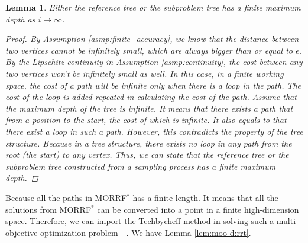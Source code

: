 \documentclass[conference]{IEEEtran}
\newtheorem{lem}{Lemma}
\begin{document}
\begin{lem}
\label{lem:tree:finite_depth}
Either the reference tree or the subproblem tree has a finite maximum depth as $ i \rightarrow \infty $.
\begin{proof}
By Assumption \ref{asmp:finite_accuracy}, we know that the distance between two vertices cannot be infinitely small, which are always bigger than or equal to $ \epsilon $.
By the Lipschitz continuity in Assumption \ref{asmp:continuity}, the cost between any two vertices won't be infinitely small as well.
In this case, in a finite working space, the cost of a path will be infinite only when there is a loop in the path.
The cost of the loop is added repeated in calculating the cost of the path.
Assume that the maximum depth of the tree is infinite.
It means that there exists a path that from a position to the start, the cost of which is infinite.
It also equals to that there exist a loop in such a path.
However, this contradicts the property of the tree structure. 
Because in a tree structure, there exists no loop in any path from the root (the start) to any vertex.
Thus, we can state that the reference tree or the subproblem tree constructed from a sampling process has a finite maximum depth.
\end{proof}
\end{lem}

Because all the paths in MORRF$^{*}$ has a finite length.
It means that all the solutions from MORRF$^{*}$ can be converted into a point in a finite high-dimension space.
Therefore, we can import the Techbycheff method in solving such a multi-objective optimization problem~\cite{4358754}~\cite{miettinen1999nonlinear}.
We have Lemma \ref{lem:moo-d:rrt}.
\end{document}
